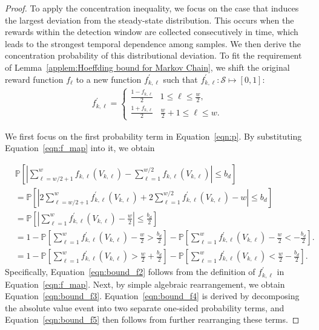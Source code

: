 \documentclass[twoside]{article}
\theoremstyle{plain}
\theoremstyle{definition}
\theoremstyle{remark}
\begin{document}
\begin{proof}
To apply the concentration inequality, we focus on the case that induces the largest deviation from the steady-state distribution. This occurs when the rewards within the detection window are collected consecutively in time, which leads to the strongest temporal dependence among samples. We then derive the concentration probability of this distributional deviation. 
To fit the requirement of Lemma~\ref{applem:Hoeffding bound for Markov Chain}, 
we shift the original reward function $f_\ell$ to a new function $f^{\prime}_{k,\ell}$ such that $f_{k,\ell}^{\prime}:\mathcal{S}\mapsto[0,1]$:
\begin{align}
        f^{\prime}_{k,\ell}=
        \begin{cases}
        \frac{1-f_{k,\ell}}{2} & 1\leq \ell \leq \frac{w}{2}, \\
        \frac{1+f_{k,\ell}}{2} & \frac{w}{2}+1\leq \ell \leq w. \label{eqn:f_map}
        \end{cases}
\end{align}

We first focus on the first probability term in Equation~\ref{eqn:p}.
By substituting Equation~\ref{eqn:f_map} into it, we obtain

\begin{subequations}
    \begin{align}
        &\mathbb{P}\left[\left\lvert 
        \sum_{\ell = w/2+1}^{w} f_{k,\ell}(V_{k,\ell}) 
        - \sum_{\ell = 1}^{w/2} f_{k,\ell}(V_{k,\ell})
        \right\rvert \leq b_d \right]\label{eqn:bound_f1} \\
        &= \mathbb{P}\left[\left\lvert 
        2\sum_{\ell = w/2+1}^{w} f^{\prime}_{k,\ell}(V_{k,\ell}) 
        + 2\sum_{\ell = 1}^{w/2} f^{\prime}_{k,\ell}(V_{k,\ell})
        - w
        \right\rvert \leq b_d \right]\label{eqn:bound_f2} \\
        &= \mathbb{P}\left[\left\lvert 
        \sum_{\ell = 1}^{w} f^{\prime}_{k,\ell}(V_{k,\ell}) 
        - \frac{w}{2}
        \right\rvert \leq \frac{b_d}{2} \right]\label{eqn:bound_f3} \\
        &= 1 - 
        \mathbb{P}\left[\sum_{\ell = 1}^{w} f^{\prime}_{k,\ell}(V_{k,\ell}) 
        - \frac{w}{2} > \frac{b_d}{2} \right]
        - 
        \mathbb{P}\left[\sum_{\ell = 1}^{w} f^{\prime}_{k,\ell}(V_{k,\ell}) 
        - \frac{w}{2} < -\frac{b_d}{2} \right]. \label{eqn:bound_f4}\\
        &= 1 - 
        \mathbb{P}\left[\sum_{\ell = 1}^{w} f^{\prime}_{k,\ell}(V_{k,\ell}) 
        > \frac{w}{2} + \frac{b_d}{2} \right]
        - 
        \mathbb{P}\left[\sum_{\ell = 1}^{w} f^{\prime}_{k,\ell}(V_{k,\ell}) 
        < \frac{w}{2} - \frac{b_d}{2} \right]. \label{eqn:bound_f5}
    \end{align}
\end{subequations}
Specifically, Equation~\ref{eqn:bound_f2} follows from the definition of $f^{\prime}_{k,\ell}$ in Equation~\ref{eqn:f_map}.
Next, by simple algebraic rearrangement, we obtain Equation~\ref{eqn:bound_f3}.
Equation~\ref{eqn:bound_f4} is derived by decomposing the absolute value event into two separate one-sided probability terms, and Equation~\ref{eqn:bound_f5} then follows from further rearranging these terms.


\end{proof}
\end{document}
